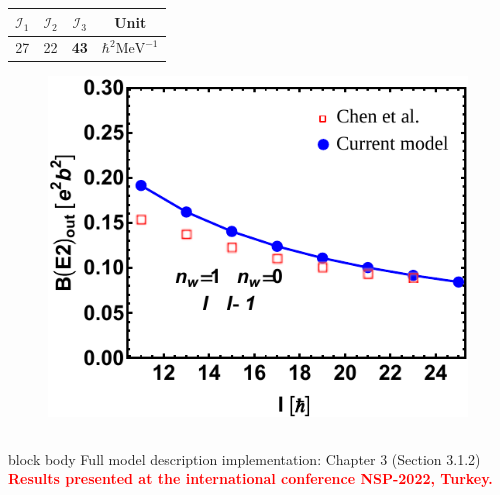 \documentclass{beamer}
\begin{document}
\begin{frame}
\begin{columns}
\begin{column}{0.4\textwidth}
\begin{table}
{\begin{tabular}{cccc}
				\multicolumn{1}{c}{$\mathcal{I}_1$} & \multicolumn{1}{c}{$\mathcal{I}_2$} & \multicolumn{1}{c}{$\mathcal{I}_3$} & \multicolumn{1}{c}{Unit}                     \\ \hline
				\multicolumn{1}{c}{27}              & \multicolumn{1}{c}{22}              & \multicolumn{1}{c}{\textbf{43}}              & \multicolumn{1}{c}{$\hbar^2\text{MeV}^{-1}$} \\ \hline
				\end{tabular}%
				}
				\label{table-params-ba130}
			\end{table}
			\begin{figure}
				\centering
				\includegraphics[width=0.99\textwidth]{figures/ba130-EM.pdf}
			\end{figure}
		\end{column}
	\end{columns}
	
			
	\begin{beamercolorbox}[rounded=true,shadow=false, wd=\linewidth,]{block body}
		\centering
		Full model description implementation: Chapter 3 (Section 3.1.2)\\
		\textcolor{red}{\textbf{Results presented at the international conference NSP-2022, Turkey.}}
	\end{beamercolorbox}
\end{frame}
\end{document}
